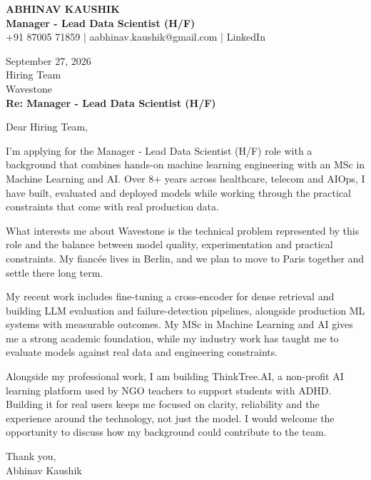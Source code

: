 \documentclass[10pt,a4paper]{article}
\begin{document}
\begin{center}
{\Large\bfseries ABHINAV KAUSHIK}\\[2pt]
{\bfseries Manager - Lead Data Scientist (H/F)}\\[2pt]
+91 87005 71859 \quad | \quad aabhinav.kaushik@gmail.com \quad | \quad LinkedIn
\end{center}
\vspace{8pt}
September 27, 2026\\[6pt]
Hiring Team\\
Wavestone\\[4pt]
\textbf{Re: Manager - Lead Data Scientist (H/F)}

Dear Hiring Team,

I’m applying for the Manager - Lead Data Scientist (H/F) role with a background that combines hands-on machine learning engineering with an MSc in Machine Learning and AI. Over 8+ years across healthcare, telecom and AIOps, I have built, evaluated and deployed models while working through the practical constraints that come with real production data.

What interests me about Wavestone is the technical problem represented by this role and the balance between model quality, experimentation and practical constraints. My fiancée lives in Berlin, and we plan to move to Paris together and settle there long term.

My recent work includes fine-tuning a cross-encoder for dense retrieval and building LLM evaluation and failure-detection pipelines, alongside production ML systems with measurable outcomes. My MSc in Machine Learning and AI gives me a strong academic foundation, while my industry work has taught me to evaluate models against real data and engineering constraints.

Alongside my professional work, I am building ThinkTree.AI, a non-profit AI learning platform used by NGO teachers to support students with ADHD. Building it for real users keeps me focused on clarity, reliability and the experience around the technology, not just the model. I would welcome the opportunity to discuss how my background could contribute to the team.

Thank you,\\
Abhinav Kaushik
\end{document}
